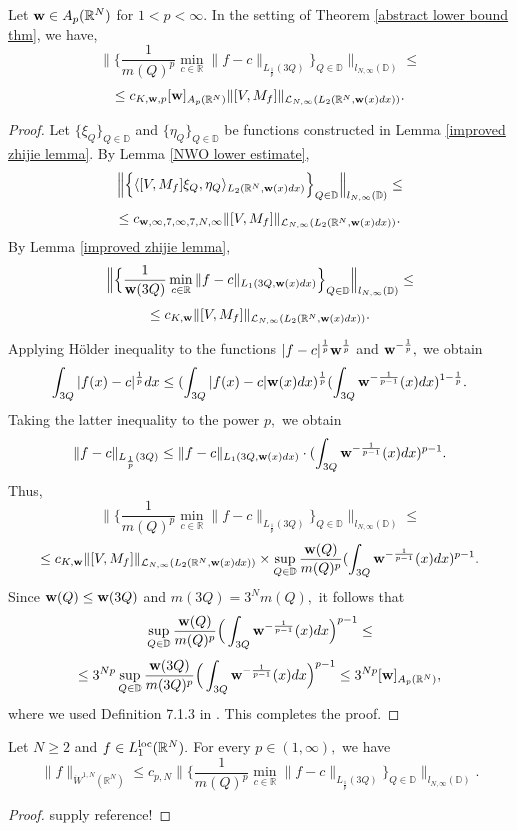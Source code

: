 \documentclass{amsart}
\begin{document}
\begin{lemma}\label{standard} Let ${\bf w}\in A_p(\mathbb{R}^N)$ for $1<p<\infty.$ In the setting of Theorem \ref{abstract lower bound thm}, we have,
$$\Big\|\Big\{\frac1{m(Q)^p}\min_{c\in\mathbb{R}}\|f-c\|_{L_{\frac1p}(3Q)}\Big\}_{Q\in\mathbb{D}}\Big\|_{l_{N,\infty}(\mathbb{D})}\leq$$
$$\leq c_{K,{\bf w},p}[{\bf w}]_{A_p(\mathbb{R}^N)}\|[V,M_f]\|_{\mathcal{L}_{N,\infty}(L_2(\mathbb{R}^N,{\bf w}(x)dx))}.$$
\end{lemma}
\begin{proof} Let $\{\xi_Q\}_{Q\in\mathbb{D}}$ and $\{\eta_Q\}_{Q\in\mathbb{D}}$ be functions constructed in Lemma \ref{improved zhijie lemma}. By Lemma \ref{NWO lower estimate},
$$\Big\|\Big\{\langle [V,M_f]\xi_Q,\eta_Q \rangle_{L_2(\mathbb{R}^N,{\bf w}(x)dx)}\Big\}_{Q\in\mathbb{D}}\Big\|_{l_{N,\infty}(\mathbb{D})}\leq $$
$$\leq c_{{\bf w},\infty,7,\infty,7,N,\infty}\|[V,M_f]\|_{\mathcal{L}_{N,\infty}(L_2(\mathbb{R}^N,{\bf w}(x)dx))}.$$
By Lemma \ref{improved zhijie lemma},
$$\Big\|\Big\{\frac1{{\bf w}(3Q)}\min_{c\in\mathbb{R}}\|f-c\|_{L_1(3Q,{\bf w}(x)dx)}\Big\}_{Q\in\mathbb{D}}\Big\|_{l_{N,\infty}(\mathbb{D})}\leq$$
$$\leq c_{K,{\bf w}}\|[V,M_f]\|_{\mathcal{L}_{N,\infty}(L_2(\mathbb{R}^N,{\bf w}(x)dx))}.$$

Applying H\"older inequality to the functions $|f-c|^{\frac1p}{\bf w}^{\frac1p}$ and ${\bf w}^{-\frac1p},$ we obtain
$$\int_{3Q}|f(x)-c|^{\frac1p}dx\leq(\int_{3Q}|f(x)-c|{\bf w}(x)dx)^{\frac1p}(\int_{3Q}{\bf w}^{-\frac1{p-1}}(x)dx)^{1-\frac1p}.$$
Taking the latter inequality to the power $p,$ we obtain
$$\|f-c\|_{L_{\frac1p}(3Q)}\leq\|f-c\|_{L_1(3Q,{\bf w}(x)dx)}\cdot (\int_{3Q}{\bf w}^{-\frac1{p-1}}(x)dx)^{p-1}.$$
Thus,
$$\Big\|\Big\{\frac1{m(Q)^p}\min_{c\in\mathbb{R}}\|f-c\|_{L_{\frac1p}(3Q)}\Big\}_{Q\in\mathbb{D}}\Big\|_{l_{N,\infty}(\mathbb{D})}\leq$$
$$\leq c_{K,{\bf w}}\|[V,M_f]\|_{\mathcal{L}_{N,\infty}(L_2(\mathbb{R}^N,{\bf w}(x)dx))}\times\sup_{Q\in\mathbb{D}}\frac{{\bf w}(Q)}{m(Q)^p}(\int_{3Q}{\bf w}^{-\frac1{p-1}}(x)dx)^{p-1}.$$
Since ${\bf w}(Q)\leq{\bf w}(3Q)$ and $m(3Q)=3^Nm(Q),$ it follows that
$$\sup_{Q\in\mathbb{D}}\frac{{\bf w}(Q)}{m(Q)^p}\Big(\int_{3Q}{\bf w}^{-\frac1{p-1}}(x)dx\Big)^{p-1}\leq$$
$$\leq 3^{Np}\sup_{Q\in\mathbb{D}}\frac{{\bf w}(3Q)}{m(3Q)^p}\Big(\int_{3Q}{\bf w}^{-\frac1{p-1}}(x)dx\Big)^{p-1}\leq 3^{Np}[{\bf w}]_{A_p(\mathbb{R}^N)},$$
where we used Definition 7.1.3 in \cite{Grafakos-1}. This completes the proof.
\end{proof}

\begin{lemma}\label{oscillation implied sobolev}
Let $N\geq2$ and $f\in L_1^{{\rm loc}}(\mathbb{R}^N).$
For every $p\in(1,\infty),$ we have
$$\|f\|_{\dot{W}^{1,N}(\mathbb{R}^N)}\leq c_{p,N}\Big\|\Big\{\frac1{m(Q)^p}\min_{c\in\mathbb{R}}
\|f-c\|_{L_{\frac1p}(3Q)}\Big\}_{Q\in\mathbb{D}}\Big\|_{l_{N,\infty}(\mathbb{D})}.$$
\end{lemma}
\begin{proof} {\color{red} supply reference!}
\end{proof}
\end{document}
